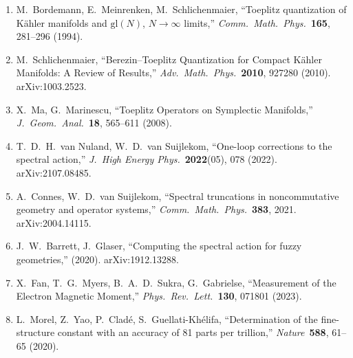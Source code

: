 \documentclass[12pt,a4paper]{article}
\theoremstyle{definition}
\theoremstyle{remark}
\begin{document}
\begin{enumerate}
\item M.~Bordemann, E.~Meinrenken, M.~Schlichenmaier,
  ``Toeplitz quantization of K\"ahler manifolds and $\mathrm{gl}(N)$,
  $N \to \infty$ limits,''
  \textit{Comm.\ Math.\ Phys.}\ \textbf{165}, 281--296 (1994).

\item M.~Schlichenmaier, ``Berezin--Toeplitz Quantization for Compact
  K\"ahler Manifolds: A Review of Results,''
  \textit{Adv.\ Math.\ Phys.}\ \textbf{2010}, 927280 (2010).
  arXiv:1003.2523.

\item X.~Ma, G.~Marinescu, ``Toeplitz Operators on Symplectic Manifolds,''
  \textit{J.\ Geom.\ Anal.}\ \textbf{18}, 565--611 (2008).

\item T.~D.~H.~van Nuland, W.~D.~van Suijlekom,
  ``One-loop corrections to the spectral action,''
  \textit{J.\ High Energy Phys.}\ \textbf{2022}(05), 078 (2022).
  arXiv:2107.08485.

\item A.~Connes, W.~D.~van Suijlekom,
  ``Spectral truncations in noncommutative geometry and operator systems,''
  \textit{Comm.\ Math.\ Phys.}\ \textbf{383}, 2021.
  arXiv:2004.14115.

\item J.~W.~Barrett, J.~Glaser,
  ``Computing the spectral action for fuzzy geometries,''
  (2020). arXiv:1912.13288.

\item X.~Fan, T.~G.~Myers, B.~A.~D.~Sukra, G.~Gabrielse,
  ``Measurement of the Electron Magnetic Moment,''
  \textit{Phys.\ Rev.\ Lett.}\ \textbf{130}, 071801 (2023).

\item L.~Morel, Z.~Yao, P.~Clad\'e, S.~Guellati-Kh\'elifa,
  ``Determination of the fine-structure constant with an accuracy
  of 81 parts per trillion,''
  \textit{Nature}\ \textbf{588}, 61--65 (2020).
\end{enumerate}
\end{document}
